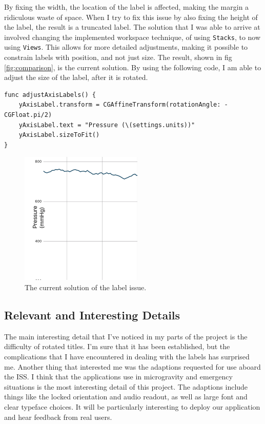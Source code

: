 \documentclass[onecolumn, draftclsnofoot,10pt, compsoc]{IEEEtran}
\begin{document}
By fixing the width, the location of the label is affected, making the margin a ridiculous waste of space.
When I try to fix this issue by also fixing the height of the label, the result is a truncated label.
The solution that I was able to arrive at involved changing the implemented workspace technique, of using \texttt{Stacks}, to now using \texttt{Views}.
This allows for more detailed adjustments, making it possible to constrain labels with position, and not just size.
The result, shown in fig \ref{fig:comparison}, is the current solution.
By using the following code, I am able to adjust the size of the label, after it is rotated.

\begin{lstlisting}
func adjustAxisLabels() {
    yAxisLabel.transform = CGAffineTransform(rotationAngle: -CGFloat.pi/2)
    yAxisLabel.text = "Pressure (\(settings.units))"
    yAxisLabel.sizeToFit()
}
\end{lstlisting}

\begin{figure}[H]
  \centering
  \includegraphics[width=.3\linewidth]{solution}
  \caption{The current solution of the label issue.}
  \label{fig:solution}
\end{figure}

\subsection{Relevant and Interesting Details}

The main interesting detail that I've noticed in my parts of the project is the difficulty of rotated titles.
I'm sure that it has been established, but the complications that I have encountered in dealing with the labels has surprised me.
Another thing that interested me was the adaptions requested for use aboard the ISS.
I think that the applications use in microgravity and emergency situations is the most interesting detail of this project.
The adaptions include things like the locked orientation and audio readout, as well as large font and clear typeface choices.
It will be particularly interesting to deploy our application and hear feedback from real users.
\end{document}
